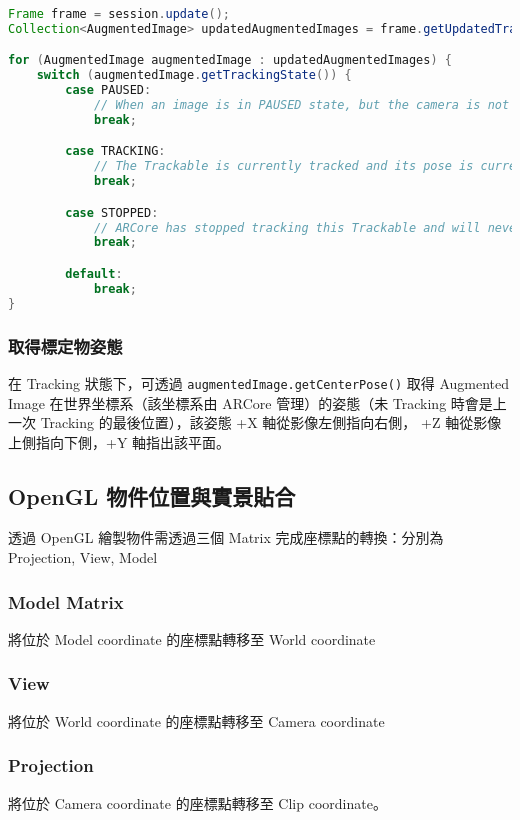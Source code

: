 \begin{lstlisting}[language=Java, caption=取得影像追蹤狀態]
Frame frame = session.update();
Collection<AugmentedImage> updatedAugmentedImages = frame.getUpdatedTrackables(AugmentedImage.class);

for (AugmentedImage augmentedImage : updatedAugmentedImages) {
    switch (augmentedImage.getTrackingState()) {
        case PAUSED:
            // When an image is in PAUSED state, but the camera is not PAUSED, it has been detected, but not yet tracked.
            break;

        case TRACKING:
            // The Trackable is currently tracked and its pose is current.
            break;

        case STOPPED:
            // ARCore has stopped tracking this Trackable and will never resume tracking it.
            break;

        default:
            break;
}
\end{lstlisting}

\subsubsection{取得標定物姿態}

在 Tracking 狀態下，可透過 \lstinline{augmentedImage.getCenterPose()} 取得 Augmented Image 在世界坐標系（該坐標系由 ARCore 管理）的姿態（未 Tracking 時會是上一次 Tracking 的最後位置），該姿態 +X 軸從影像左側指向右側， +Z 軸從影像上側指向下側，+Y 軸指出該平面。

\subsection{OpenGL 物件位置與實景貼合}

透過 OpenGL 繪製物件需透過三個 Matrix 完成座標點的轉換：分別為 Projection, View, Model

\subsubsection{Model Matrix}
將位於 Model coordinate 的座標點轉移至 World coordinate

\subsubsection{View}
將位於 World coordinate 的座標點轉移至 Camera coordinate

\subsubsection{Projection}
將位於 Camera coordinate 的座標點轉移至 Clip coordinate。

